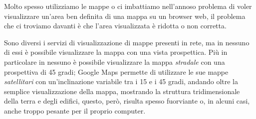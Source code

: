 Molto spesso utilizziamo le mappe o ci imbattiamo nell'annoso problema di voler visualizzare un'area ben definita di una mappa su un browser web, il problema che ci troviamo davanti è che l'area visualizzata è ridotta o non corretta. 


Sono diversi i servizi di visualizzazione di mappe presenti in rete, ma in nessuno di essi è possibile visualizzare la mappa con una vista prospettica. Più in particolare in nessuno è possibile visualizzare la mappa \textit{stradale} con una prospettiva di 45 gradi; Google Maps permette di utilizzare le sue mappe \textit{satellitari} con un'inclinazione variabile tra i 15 e i 45 gradi, andando oltre la semplice visualizzazione della mappa, mostrando la struttura tridimensionale della terra e degli edifici, questo, però, risulta spesso fuorviante o, in alcuni casi, anche troppo pesante per il proprio computer.